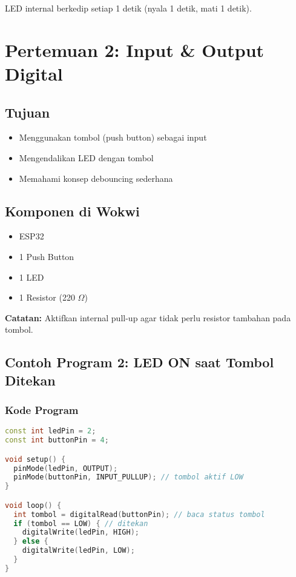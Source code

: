 \documentclass[12pt,a4paper]{article}
\begin{document}
\begin{tcolorbox}[colback=blue!5!white,colframe=blue!75!black,title=Hasil]
LED internal berkedip setiap 1 detik (nyala 1 detik, mati 1 detik).
\end{tcolorbox}

\newpage
\section{Pertemuan 2: Input \& Output Digital}

\subsection{Tujuan}
\begin{itemize}
    \item Menggunakan tombol (push button) sebagai input
    \item Mengendalikan LED dengan tombol
    \item Memahami konsep debouncing sederhana
\end{itemize}

\subsection{Komponen di Wokwi}
\begin{itemize}
    \item ESP32
    \item 1 Push Button
    \item 1 LED
    \item 1 Resistor (220 $\Omega$)
\end{itemize}

\textbf{Catatan:} Aktifkan internal pull-up agar tidak perlu resistor tambahan pada tombol.

\subsection{Contoh Program 2: LED ON saat Tombol Ditekan}

\subsubsection{Kode Program}
\begin{lstlisting}[language=C++, caption={Kontrol LED dengan Tombol}]
const int ledPin = 2;
const int buttonPin = 4;

void setup() {
  pinMode(ledPin, OUTPUT);
  pinMode(buttonPin, INPUT_PULLUP); // tombol aktif LOW
}

void loop() {
  int tombol = digitalRead(buttonPin); // baca status tombol
  if (tombol == LOW) { // ditekan
    digitalWrite(ledPin, HIGH);
  } else {
    digitalWrite(ledPin, LOW);
  }
}
\end{lstlisting}
\end{document}
